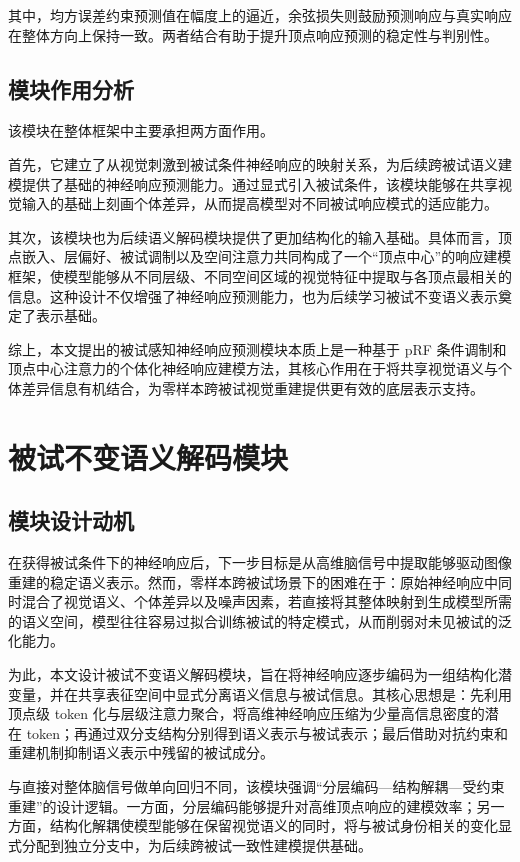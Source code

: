 其中，均方误差约束预测值在幅度上的逼近，余弦损失则鼓励预测响应与真实响应在整体方向上保持一致。两者结合有助于提升顶点响应预测的稳定性与判别性。

\subsection{模块作用分析}

该模块在整体框架中主要承担两方面作用。

首先，它建立了从视觉刺激到被试条件神经响应的映射关系，为后续跨被试语义建模提供了基础的神经响应预测能力。通过显式引入被试条件，该模块能够在共享视觉输入的基础上刻画个体差异，从而提高模型对不同被试响应模式的适应能力。

其次，该模块也为后续语义解码模块提供了更加结构化的输入基础。具体而言，顶点嵌入、层偏好、被试调制以及空间注意力共同构成了一个“顶点中心”的响应建模框架，使模型能够从不同层级、不同空间区域的视觉特征中提取与各顶点最相关的信息。这种设计不仅增强了神经响应预测能力，也为后续学习被试不变语义表示奠定了表示基础。

综上，本文提出的被试感知神经响应预测模块本质上是一种基于 pRF 条件调制和顶点中心注意力的个体化神经响应建模方法，其核心作用在于将共享视觉语义与个体差异信息有机结合，为零样本跨被试视觉重建提供更有效的底层表示支持。

\section{被试不变语义解码模块}

\subsection{模块设计动机}

在获得被试条件下的神经响应后，下一步目标是从高维脑信号中提取能够驱动图像重建的稳定语义表示。然而，零样本跨被试场景下的困难在于：原始神经响应中同时混合了视觉语义、个体差异以及噪声因素，若直接将其整体映射到生成模型所需的语义空间，模型往往容易过拟合训练被试的特定模式，从而削弱对未见被试的泛化能力。

为此，本文设计被试不变语义解码模块，旨在将神经响应逐步编码为一组结构化潜变量，并在共享表征空间中显式分离语义信息与被试信息。其核心思想是：先利用顶点级 token 化与层级注意力聚合，将高维神经响应压缩为少量高信息密度的潜在 token；再通过双分支结构分别得到语义表示与被试表示；最后借助对抗约束和重建机制抑制语义表示中残留的被试成分。

与直接对整体脑信号做单向回归不同，该模块强调“分层编码—结构解耦—受约束重建”的设计逻辑。一方面，分层编码能够提升对高维顶点响应的建模效率；另一方面，结构化解耦使模型能够在保留视觉语义的同时，将与被试身份相关的变化显式分配到独立分支中，为后续跨被试一致性建模提供基础。

